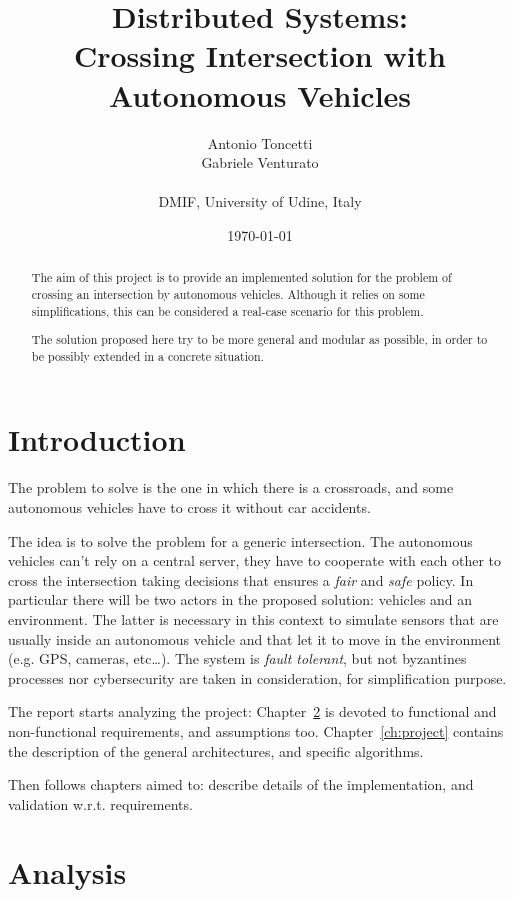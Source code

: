 \documentclass{memoir}
\title{Distributed Systems:\\Crossing Intersection with Autonomous Vehicles}
\author{Antonio Toncetti\\Gabriele Venturato\\\\DMIF, University of Udine, Italy}
\date{%
	\today}
\begin{document}
\maketitle
\begin{abstract}
The aim of this project is to provide an implemented solution for the problem of crossing an intersection by autonomous vehicles.
Although it relies on some simplifications, this can be considered a real-case scenario for this problem.

The solution proposed here try to be more general and modular as possible, in order to be possibly extended in a concrete situation.
\end{abstract}

\chapter{Introduction}\label{ch:intro}

The problem to solve is the one in which there is a crossroads, and some autonomous vehicles have to cross it without car accidents. 

The idea is to solve the problem for a generic intersection. The autonomous vehicles can't rely on a central server, they have to cooperate with each other to cross the intersection taking decisions that ensures a \emph{fair} and \emph{safe} policy. In particular there will be two actors in the proposed solution: vehicles and an environment. The latter is necessary in this context to simulate sensors that are usually inside an autonomous vehicle and that let it to move in the environment (e.g. GPS, cameras, etc\dots).
The system is \emph{fault tolerant}, but not byzantines processes nor cybersecurity are taken in consideration, for simplification purpose.

The report starts analyzing the project: Chapter~\ref{ch:analysis} is devoted to functional and non-functional requirements, and assumptions too. Chapter~\ref{ch:project} contains the description of the general architectures, and specific algorithms.

Then follows chapters aimed to: describe details of the implementation, and validation w.r.t. requirements.



\chapter{Analysis}\label{ch:analysis}
\end{document}

